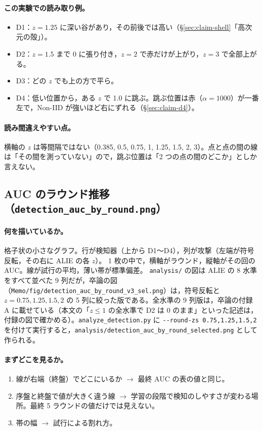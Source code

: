 \documentclass[a4j, dvipdfmx]{jsarticle}  %
\begin{document}
\paragraph{この実験での読み取り例。}
\begin{itemize}
  \item D1：$z = 1.25$ に深い谷があり，その前後では高い（\S\ref{sec:claim-shell}「高次元の殻」）。
  \item D2：$z = 1.5$ まで 0 に張り付き，$z = 2$ で赤だけが上がり，$z = 3$ で全部上がる。
  \item D3：どの $z$ でも上の方で平ら。
  \item D4：低い位置から，ある $z$ で 1.0 に跳ぶ。跳ぶ位置は赤（$\alpha = 1000$）が一番左で，Non-IID が強いほど右にずれる（\S\ref{sec:claim-d4}）。
\end{itemize}

\paragraph{読み間違えやすい点。}
横軸の $z$ は等間隔ではない（0.385, 0.5, 0.75, 1, 1.25, 1.5, 2, 3）。点と点の間の線は「その間を測っていない」ので，跳ぶ位置は「2 つの点の間のどこか」としか言えない。

\subsection{AUC のラウンド推移（\texttt{detection\_auc\_by\_round.png}）}

\paragraph{何を描いているか。}
格子状の小さなグラフ。行が検知器（上から D1〜D4），列が攻撃（左端が符号反転，その右に ALIE の各 $z$）。
1 枚の中で，横軸がラウンド，縦軸がその回の AUC。線が試行の平均，薄い帯が標準偏差。
\texttt{analysis/} の図は ALIE の 8 水準をすべて並べた 9 列だが，卒論の図（\texttt{Memo/fig/detection\_auc\_by\_round\_v3\_sel.png}）は，符号反転と $z = 0.75, 1.25, 1.5, 2$ の 5 列に絞った版である。全水準の 9 列版は，卒論の付録 A に載せている（本文の「$z \le 1$ の全水準で D2 は 0 のまま」といった記述は，付録の図で確かめる）。\texttt{analyze\_detection.py} に \texttt{-{}-round-zs 0.75,1.25,1.5,2} を付けて実行すると，\texttt{analysis/detection\_auc\_by\_round\_selected.png} として作られる。

\paragraph{まずどこを見るか。}
\begin{enumerate}
  \item 線が右端（終盤）でどこにいるか $\rightarrow$ 最終 AUC の表の値と同じ。
  \item 序盤と終盤で値が大きく違う線 $\rightarrow$ 学習の段階で検知のしやすさが変わる場所。最終 5 ラウンドの値だけでは見えない。
  \item 帯の幅 $\rightarrow$ 試行による割れ方。
\end{enumerate}
\end{document}
